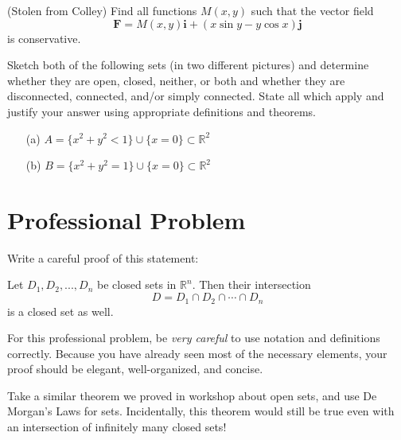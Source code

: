 \documentclass{ximera}
\begin{document}
\begin{problem}
(Stolen from Colley) Find all functions $M(x,y)$ such that the vector field
\[
\mathbf{F}=M(x,y)\mathbf{i}+(x\sin y-y\cos x)\mathbf{j}
\]
is conservative.
\end{problem}

\begin{problem}
Sketch both of the following sets (in two different pictures) and determine whether they are open, closed, neither, or both and whether they are disconnected, connected, and/or simply connected. State all which apply and justify your answer using appropriate definitions and theorems.
\begin{enumerate}
\item[(a)] $A=\{x^2+y^2<1\}\cup\{x=0\}\subset\mathbb{R}^2$
\item[(b)] $B=\{x^2+y^2=1\}\cup\{x=0\}\subset\mathbb{R}^2$
\end{enumerate}
\end{problem}

\section{Professional Problem}


\begin{problem}
Write a careful proof of this statement:

\begin{theorem}
Let $D_1,D_2,...,D_n$ be closed sets in $\mathbb{R}^n$. Then their intersection
\[
D=D_1\cap D_2\cap\cdots\cap D_n
\]
is a closed set as well.
\end{theorem}

For this professional problem, be \emph{very careful} to use notation and definitions correctly. Because you have already seen most of the necessary elements, your proof should be elegant, well-organized, and concise.

\begin{hint}
Take a similar theorem we proved in workshop about open sets, and use De Morgan's Laws for sets. Incidentally, this theorem would still be true even with an intersection of infinitely many closed sets!
\end{hint}
\end{problem}
\end{document}
